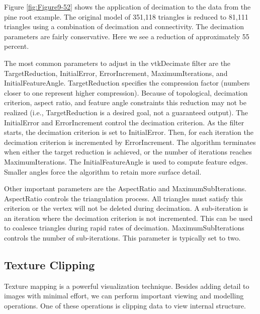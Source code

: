Figure \ref{fig:Figure9-52} shows the application of decimation to the data from the pine root example. The original model of 351,118 triangles is reduced to 81,111 triangles using a combination of decimation and connectivity. The decimation parameters are fairly conservative. Here we see a reduction of approximately 55 percent.

The most common parameters to adjust in the vtkDecimate filter are the TargetReduction, InitialError, ErrorIncrement, MaximumIterations, and InitialFeatureAngle. TargetReduction specifies the compression factor (numbers closer to one represent higher compression). Because of topological, decimation criterion, aspect ratio, and feature angle constraints this reduction may not be realized (i.e., TargetReduction is a desired goal, not a guaranteed output). The InitialError and ErrorIncrement control the decimation criterion. As the filter starts, the decimation criterion is set to InitialError. Then, for each iteration the decimation criterion is incremented by ErrorIncrement. The algorithm terminates when either the target reduction is achieved, or the number of iterations reaches MaximumIterations. The InitialFeatureAngle is used to compute feature edges. Smaller angles force the algorithm to retain more surface detail.

Other important parameters are the AspectRatio and MaximumSubIterations. AspectRatio controls the triangulation process. All triangles must satisfy this criterion or the vertex will not be deleted during decimation. A sub-iteration is an iteration where the decimation criterion is not incremented. This can be used to coalesce triangles during rapid rates of decimation. MaximumSubIterations controls the number of sub-iterations. This parameter is typically set to two.

\subsection{Texture Clipping}

Texture mapping is a powerful visualization technique. Besides adding detail to images with minimal effort, we can perform important viewing and modelling operations. One of these operations is clipping data to view internal structure.

